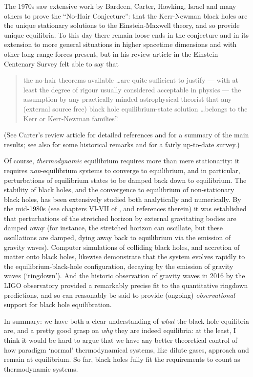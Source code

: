 \documentclass[12pt]{article}
\begin{document}
The 1970s saw extensive work by Bardeen, Carter, Hawking, Israel and many others to prove the ``No-Hair Conjecture'': that the Kerr-Newman black holes are the unique stationary solutions to the Einstein-Maxwell theory, and so provide unique equilibria. To this day there remain loose ends in the conjecture and in its extension to more general situations in higher spacetime dimensions and with other long-range forces present, but in his review article in the Einstein Centenary Survey \cite{carter1979} felt able to say that
\begin{quote}
the no-hair theorems available \ldots are quite sufficient to justify --- with at least the degree of rigour usually considered acceptable in physics --- the assumption by any practically minded astrophysical theorist that any (external source free) black hole equilibrium-state solution \ldots belongs to the Kerr or Kerr-Newman families''.
\end{quote}
(See Carter's review article for detailed references and for a summary of the main results; see also  for some historical remarks and  for a fairly up-to-date survey.)

Of course, \emph{thermodynamic} equilibrium requires more than mere stationarity: it requires \emph{non}-equilibrium systems to converge to equilibrium, and in particular, perturbations of equilibrium states to be damped back down to equilibrium. The stability of black holes, and the convergence to equilibrium of non-stationary black holes, has been extensively studied both analytically and numerically. By the mid-1980s (see chapters VI-VII of , and references therein) it was established that perturbations of the stretched horizon by external gravitating bodies are damped away (for instance, the stretched horizon can oscillate, but these oscillations are damped, dying away back to equilibrium via the emission of gravity waves). Computer simulations of colliding black holes, and accretion of matter onto black holes, likewise demonstrate that the system evolves rapidly to the equilibrium-black-hole configuration, decaying by the emission of gravity waves (`ringdown'). And the historic observation of gravity waves in 2016 by the LIGO observatory \cite{ligo2016} provided a remarkably precise fit to the quantitative ringdown predictions, and so can reasonably be said to provide (ongoing) \emph{observational} support for black hole equilibration.

In summary: we have both a clear understanding of \emph{what} the black hole equilibria are, and a pretty good grasp on \emph{why} they are indeed equilibria: at the least, I think it would be hard to argue that we have any better theoretical control of how paradigm `normal' thermodynamical systems, like dilute gases, approach and remain at equilibrium. So far, black holes fully fit the requirements to count as thermodynamic systems.
\end{document}
